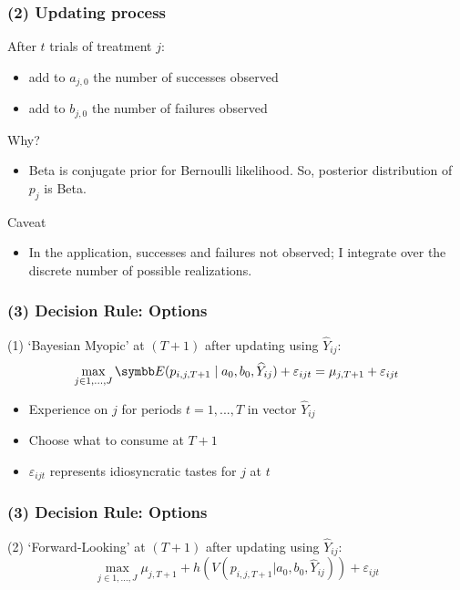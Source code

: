\documentclass[aspectratio=169,11pt]{beamer}
\begin{document}
\begin{frame}
\frametitle{(2) Updating process}

After $t$ trials of treatment $j$:

\begin{itemize}
\item add to $a_{j,0}$ the number of successes observed

\item add to $b_{j,0}$ the number of failures observed
\end{itemize}

Why?

\begin{itemize}
\item Beta is conjugate prior for Bernoulli likelihood. So, posterior
distribution of $p_{j}$ is Beta.
\end{itemize}

Caveat

\begin{itemize}
\item In the application, successes and failures not observed; I integrate
over the discrete number of possible realizations.
\end{itemize}
\end{frame}

\begin{frame}
\frametitle{(3) Decision Rule: Options}
\small
(1) `Bayesian Myopic' at $(T+1)$ after updating using $\widehat{Y}_{ij}$: 
\[
\max_{j\in 1,...,J} \E(p_{i,j,T+1} \mid a_{0},b_{0},\widehat{Y}_{ij}) +
\varepsilon_{ijt}=\mu _{j,T+1} + \varepsilon_{ijt} 
\]

\begin{itemize}
\item Experience on $j$ for periods $t=1,...,T$ in vector $\widehat{Y}_{ij}$

\item Choose what to consume at $T+1$

\item $\varepsilon_{ijt}$ represents idiosyncratic tastes for $j$ at $t$
\end{itemize}
\end{frame}


\begin{frame}
\frametitle{(3) Decision Rule: Options}
\small

(2) `Forward-Looking' at $(T+1)$ after updating using $\widehat{Y}_{ij}$:%
\[
\max_{j\in 1,...,J}\mu _{j,T+1} + h(V(p_{i,j,T+1}|a_{0},b_{0},\widehat{Y}%
_{ij})) + \varepsilon_{ijt} 
\]
\end{frame}
\end{document}
